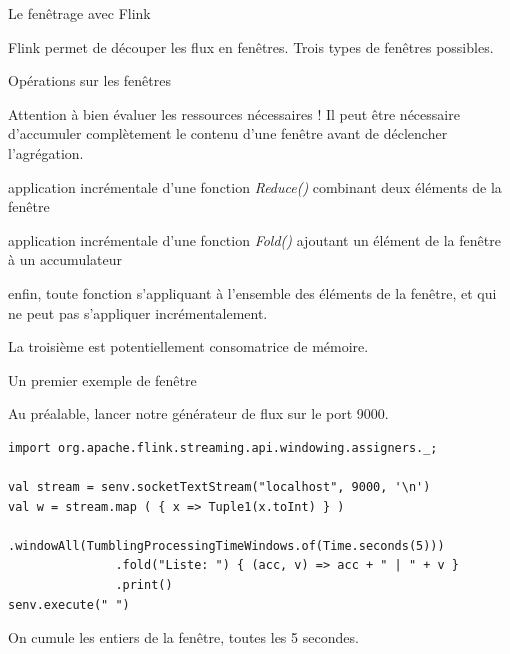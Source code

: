 
\begin{frame}{Le  fenêtrage  avec Flink}

Flink permet de découper les flux en \alert{fenêtres}. Trois types de fenêtres possibles.

\vfill


\end{frame}



\begin{frame}{Opérations sur les fenêtres}

Attention à bien évaluer les ressources nécessaires ! Il peut être nécessaire d'accumuler complètement le contenu 
d'une fenêtre avant de déclencher l'agrégation.

\vfill

\begin{redbullet}
   \item  application \alert{incrémentale} d’une fonction \textit{Reduce()} 
      combinant deux éléments de la fenêtre
   \item    application \alert{incrémentale} d’une fonction \textit{Fold()}
   ajoutant un élément de la fenêtre à un accumulateur
   \item   enfin, toute fonction s’appliquant à l’ensemble des éléments de la fenêtre, et qui ne peut pas s’appliquer incrémentalement.
\end{redbullet}

\vfill

La troisième est potentiellement consomatrice de mémoire.

\end{frame}



\begin{frame}[fragile]{Un premier exemple de fenêtre}

Au préalable, lancer notre générateur de flux sur le port 9000.

\vfill

\begin{verbatim}
import org.apache.flink.streaming.api.windowing.assigners._;

val stream = senv.socketTextStream("localhost", 9000, '\n')
val w = stream.map ( { x => Tuple1(x.toInt) } )
              .windowAll(TumblingProcessingTimeWindows.of(Time.seconds(5)))
               .fold("Liste: ") { (acc, v) => acc + " | " + v }
               .print()
senv.execute(" ")
\end{verbatim}

\vfill

On cumule les entiers de la fenêtre, toutes les 5 secondes.
\end{frame}


